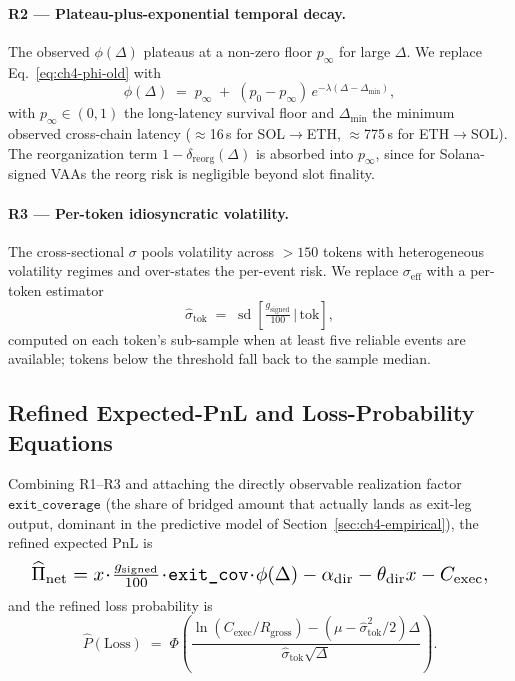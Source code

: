 \documentclass[sigconf,nonacm,10pt]{acmart}
\newcommand{\SolEth}{SOL$\to$ETH}
\newcommand{\EthSol}{ETH$\to$SOL}
\newcommand{\gsigned}{g_{\text{signed}}}
\newcommand{\Cexec}{C_{\text{exec}}}
\newcommand{\Rgross}{R_{\text{gross}}}
\begin{document}
\paragraph{R2 --- Plateau-plus-exponential temporal decay.} The observed
$\phi(\Delta)$ plateaus at a non-zero floor $p_{\infty}$ for large
$\Delta$. We replace Eq.~\eqref{eq:ch4-phi-old} with
\begin{equation}
\label{eq:ch4-phi-new}
    \phi(\Delta) \;=\; p_{\infty} \;+\;
        (p_{0} - p_{\infty})\,e^{-\lambda(\Delta-\Delta_{\min})},
\end{equation}
with $p_{\infty} \in (0,1)$ the long-latency survival floor and
$\Delta_{\min}$ the minimum observed cross-chain latency ($\approx$16\,s
for \SolEth, $\approx$775\,s for \EthSol). The reorganization term
$1-\delta_{\text{reorg}}(\Delta)$ is absorbed into $p_{\infty}$, since for
Solana-signed VAAs the reorg risk is negligible beyond slot finality.

\paragraph{R3 --- Per-token idiosyncratic volatility.} The cross-sectional
$\sigma$ pools volatility across $>\!150$ tokens with heterogeneous
volatility regimes and over-states the per-event risk. We replace
$\sigma_{\text{eff}}$ with a per-token estimator
\begin{equation}
\label{eq:ch4-sigma-token}
    \hat\sigma_{\text{tok}} \;=\;
    \operatorname{sd}\!\left[\tfrac{g_{\text{signed}}}{100}\,
    \Big|\,\text{tok}\right],
\end{equation}
computed on each token's sub-sample when at least five reliable events are
available; tokens below the threshold fall back to the sample median.

\subsection{Refined Expected-PnL and Loss-Probability Equations}

Combining R1--R3 and attaching the directly observable realization factor
$\texttt{exit\_coverage}$ (the share of bridged amount that actually lands
as exit-leg output, dominant in the predictive model of
Section~\ref{sec:ch4-empirical}), the refined expected PnL is
\begin{equation}
\label{eq:ch4-pi-hat}
\resizebox{0.95\columnwidth}{!}{$
    \widehat{\Pi}_{\text{net}} =
    x\!\cdot\!\tfrac{\gsigned}{100}\!\cdot\!\texttt{exit\_cov}\!\cdot\!\phi(\Delta)
    - \alpha_{\text{dir}} - \theta_{\text{dir}} x - \Cexec,
$}
\end{equation}
and the refined loss probability is
\begin{equation}
\label{eq:ch4-ploss-new}
    \widehat{P}(\text{Loss}) \;=\;
    \Phi\!\left(\frac{\ln(\Cexec/\Rgross) -
        (\mu - \hat\sigma_{\text{tok}}^{2}/2)\Delta}
        {\hat\sigma_{\text{tok}}\sqrt{\Delta}}\right).
\end{equation}
\end{document}
